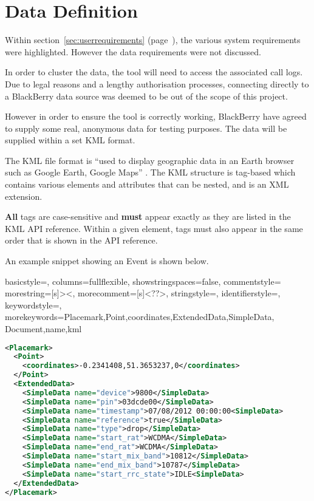 \section{Data Definition}

Within section~\ref{sec:userrequirements} (page~\pageref{sec:userrequirements}), 
the various system requirements were highlighted. However the data requirements 
were not discussed. 

In order to cluster the data, the tool will need to access the associated call 
logs. Due to legal reasons and a lengthy authorisation processes, connecting 
directly to a BlackBerry data source was deemed to be out of the scope of this
project. 

However in order to ensure the tool is correctly working, BlackBerry have 
agreed to supply some real, anonymous data for testing purposes. The data will 
be supplied within a set KML format.

The KML file format is ``used to display geographic data in an Earth browser 
such as Google Earth, Google Maps'' \citep{google:KML}. The KML structure is 
tag-based which contains various elements and attributes that can be nested, 
and is an XML extension.

{\bf All} tags are case-sensitive and {\bf must} appear exactly as they are 
listed in the KML API reference. Within a given element, tags must also appear 
in the same order that is shown in the API reference. 

An example snippet showing an Event is shown below.

{
  basicstyle=\ttfamily\small,
  columns=fullflexible,
  showstringspaces=false,
  commentstyle=\color{gray}\upshape
  morestring=[s]{>}{<},
  morecomment=[s]{<?}{?>},
  stringstyle=\color{black},
  identifierstyle=\color{pink},
  keywordstyle=\color{darkblue},
  morekeywords={Placemark,Point,coordinates,ExtendedData,SimpleData,
                Document,name,kml}
}

\begin{lstlisting}[language=XML]
<Placemark>
  <Point>
    <coordinates>-0.2341408,51.3653237,0</coordinates>
  </Point>
  <ExtendedData>
    <SimpleData name="device">9800</SimpleData>
    <SimpleData name="pin">03dcde00</SimpleData>
    <SimpleData name="timestamp">07/08/2012 00:00:00<SimpleData>
    <SimpleData name="reference">true</SimpleData>          
    <SimpleData name="type">drop</SimpleData>
    <SimpleData name="start_rat">WCDMA</SimpleData>
    <SimpleData name="end_rat">WCDMA</SimpleData>
    <SimpleData name="start_mix_band">10812</SimpleData>
    <SimpleData name="end_mix_band">10787</SimpleData>
    <SimpleData name="start_rrc_state">IDLE<SimpleData>
  </ExtendedData>
</Placemark>
\end{lstlisting}


